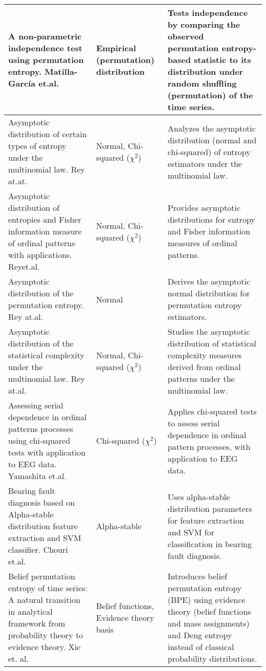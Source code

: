 \begin{longtable}{|p{5.5cm}|p{2.5cm}|p{6.5cm}|}
	A non-parametric independence test using permutation entropy. Matilla-García et.al.~\cite{MatillaGarcia2008} & Empirical (permutation) distribution & Tests independence by comparing the observed permutation entropy-based statistic to its distribution under random shuffling (permutation) of the time series.\\
	\hline
	Asymptotic distribution of certain types of entropy under the multinomial law. Rey at.at.~\cite{Rey2023} & Normal, Chi-squared ($\chi^2$) & Analyzes the asymptotic distribution (normal and chi-squared) of entropy estimators under the multinomial law. \\
	\hline
	Asymptotic distribution of entropies and Fisher information measure of ordinal patterns with applications. Reyet.al.~\cite{Rey2024} & Normal, Chi-squared ($\chi^2$) & Provides asymptotic distributions for entropy and Fisher information measures of ordinal patterns. \\
	\hline
	Asymptotic distribution of the permutation entropy. Rey at.al.~\cite{Rey2023a} & Normal & Derives the asymptotic normal distribution for permutation entropy estimators. \\
	\hline
	Asymptotic distribution of the statistical complexity under the multinomial law. Rey at.al.~\cite{Rey2025} & Normal, Chi-squared ($\chi^2$) & Studies the asymptotic distribution of statistical complexity measures derived from ordinal patterns under the multinomial law. \\
	\hline
	Assessing serial dependence in ordinal patterns processes using chi-squared tests with application to EEG data. Yamashita et.al.~\cite{YamashitaRiosDeSousa2022} & Chi-squared ($\chi^2$) & Applies chi-squared tests to assess serial dependence in ordinal pattern processes, with application to EEG data. \\
	\hline
	Bearing fault diagnosis based on Alpha-stable distribution feature extraction and SVM classifier. Chouri et.al.~\cite{Chouri2014} & Alpha-stable & Uses alpha-stable distribution parameters for feature extraction and SVM for classification in bearing fault diagnosis. \\
	\hline
	Belief permutation entropy of time series: A natural transition in analytical framework from probability theory to evidence theory. Xie et. al.~\cite{Xie2025} & Belief functions, Evidence theory basis & Introduces belief permutation entropy (BPE) using evidence theory (belief functions and mass assignments) and Deng entropy instead of classical probability distributions. \\

\end{longtable}
